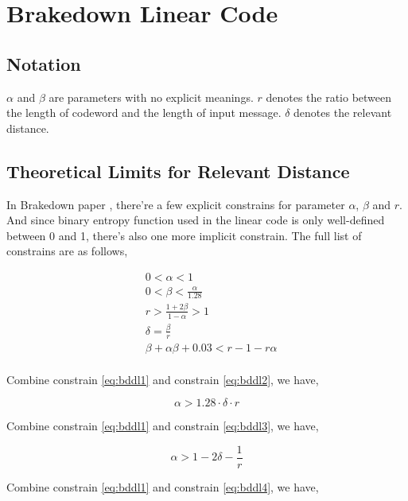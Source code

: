 \chapter{Brakedown Linear Code}


\section{Notation}

$\alpha$ and $\beta$ are parameters with no explicit meanings. $r$ denotes the ratio between the length of codeword and the length of input message. $\delta$ denotes the relevant distance.

\section{Theoretical Limits for Relevant Distance}

In Brakedown paper \cite{brakedown}, there're a few explicit constrains for parameter $\alpha$, $\beta$ and $r$. And since binary entropy function used in the linear code is only well-defined between 0 and 1, there's also one more implicit constrain. The full list of constrains are as follows,

\begin{align}
& 0 < \alpha < 1 \nonumber \\
& 0 < \beta < \frac{\alpha}{1.28} \label{eq:bddl2} \\
& r > \frac{1 + 2\beta}{1 - \alpha} > 1 \label{eq:bddl3} \\
& \delta = \frac{\beta}{r} \label{eq:bddl1} \\
& \beta + \alpha\beta + 0.03 < r - 1 - r\alpha \label{eq:bddl4} \\
\end{align}

Combine constrain \ref{eq:bddl1} and constrain \ref{eq:bddl2}, we have,

\begin{equation}
\label{eq:bddl5}
    \alpha > 1.28 \cdot \delta \cdot r 
\end{equation}
    

Combine constrain \ref{eq:bddl1} and constrain \ref{eq:bddl3}, we have,

\begin{equation}
\label{eq:bddl6}
    \alpha > 1 - 2\delta - \frac{1}{r} 
\end{equation}


Combine constrain \ref{eq:bddl1} and constrain \ref{eq:bddl4}, we have,

